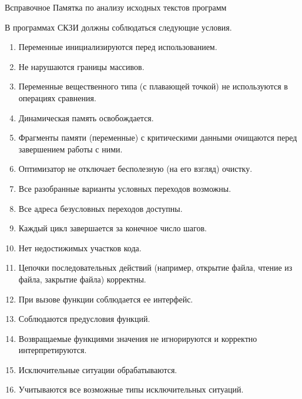 \begin{appendix}{В}{справочное}
{Памятка по анализу исходных текстов программ}
\label{REVIEW} 

\mbox{}

В программах СКЗИ должны соблюдаться следующие условия.

\begin{enumerate}
\item 
Переменные инициализируются перед использованием.

\item 
Не нарушаются границы массивов.

\item 
Переменные вещественного типа (с плавающей точкой) не используются в операциях
сравнения.

\item 
Динамическая память освобождается.

\item 
Фрагменты памяти (переменные) с критическими данными очищаются перед 
завершением работы с ними. 

\item
Оптимизатор не отключает бесполезную (на его взгляд) очистку.

\item 
Все разобранные варианты условных переходов возможны.

\item 
Все адреса безусловных переходов доступны.

\item 
Каждый цикл завершается за конечное число шагов.

\item 
Нет недостижимых участков кода.

\item 
Цепочки последовательных действий (например, открытие файла, 
чтение из файла, закрытие файла) корректны. 

\item 
При вызове функции соблюдается ее интерфейс.

\item 
Соблюдаются предусловия функций.

\item 
Возвращаемые функциями значения не игнорируются и корректно интерпретируются.

\item 
Исключительные ситуации обрабатываются. 

\item 
Учитываются все возможные типы исключительных ситуаций. 


\end{enumerate}
\end{appendix}
